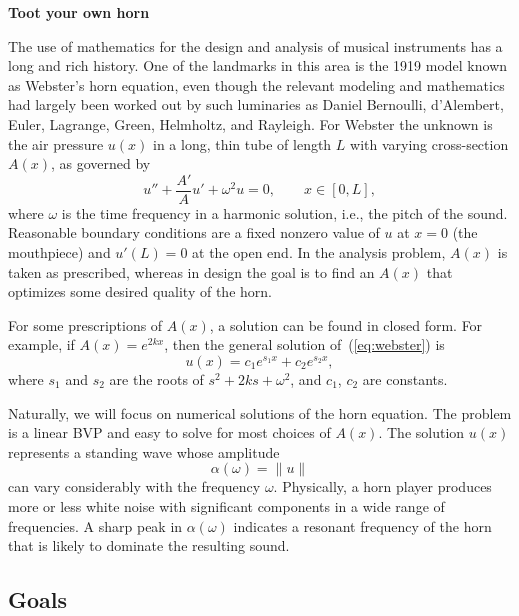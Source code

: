 \documentclass[11pt,twoside]{article}
\begin{document}
   
\begin{center}
    \bf Toot your own horn
\end{center}

The use of mathematics for the design and analysis of musical instruments has a long and rich history. One of the landmarks in this area is the 1919 model known as Webster's horn equation, even though the relevant modeling and mathematics had largely been worked out by such luminaries as Daniel Bernoulli, d'Alembert, Euler, Lagrange, Green, Helmholtz, and Rayleigh. For Webster the unknown is the air pressure $u(x)$ in a long, thin tube of length $L$ with varying cross-section $A(x)$, as governed by
\begin{equation}
  \label{eq:webster}
  u'' + \frac{A'}{A} u' + \omega^2 u = 0, \qquad x\in [0,L],
\end{equation}
where $\omega$ is the time frequency in a harmonic solution, i.e., the pitch of the sound. Reasonable boundary conditions are a fixed nonzero value of $u$ at $x=0$ (the mouthpiece) and $u'(L)=0$ at the open end. In the analysis problem, $A(x)$ is taken as prescribed, whereas in design the goal is to find an $A(x)$ that optimizes some desired quality of the horn. 

For some prescriptions of $A(x)$, a solution can be found in closed form. For example, if $A(x)=e^{2k x}$, then the general solution of~(\ref{eq:webster}) is
\begin{equation}
  \label{eq:solution-exp}
  u(x) = c_1 e^{s_1 x} + c_2 e^{s_2 x},
\end{equation}
where $s_1$ and $s_2$ are the roots of $s^2+2k s + \omega^2$, and $c_1$, $c_2$ are constants.  

Naturally, we will focus on numerical solutions of the horn equation. The problem is a linear BVP and easy to solve for most choices of $A(x)$. The solution $u(x)$ represents a standing wave whose amplitude 
\begin{equation}
  \label{eq:amplitude}
  \alpha(\omega)=\|u\|  
\end{equation}
can vary considerably with the frequency $\omega$. Physically, a horn player produces more or less white noise with significant components in a wide range of frequencies. A sharp peak in $\alpha(\omega)$ indicates a resonant frequency of the horn that is likely to dominate the resulting sound. 

\subsection*{Goals}
\end{document}
